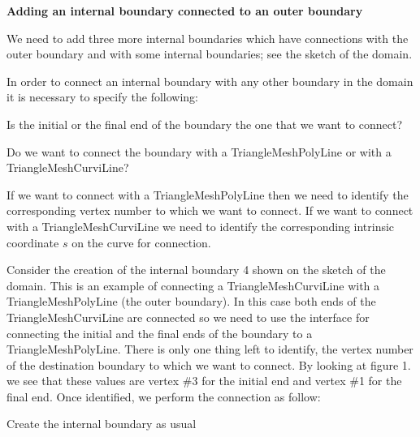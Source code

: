 {\bfseries  Adding an internal boundary connected to an outer boundary }

We need to add three more internal boundaries which have connections with the outer boundary and with some internal boundaries; see the sketch of the domain.

In order to connect an internal boundary with any other boundary in the domain it is necessary to specify the following\+:


\begin{DoxyItemize}
\item Is the initial or the final end of the boundary the one that we want to connect?
\item Do we want to connect the boundary with a {\ttfamily Triangle\+Mesh\+Poly\+Line} or with a {\ttfamily Triangle\+Mesh\+Curvi\+Line}?
\item If we want to connect with a {\ttfamily Triangle\+Mesh\+Poly\+Line} then we need to identify the corresponding vertex number to which we want to connect. If we want to connect with a {\ttfamily Triangle\+Mesh\+Curvi\+Line} we need to identify the corresponding intrinsic coordinate $ s $ on the curve for connection.
\end{DoxyItemize}





Consider the creation of the internal boundary 4 shown on the sketch of the domain. This is an example of connecting a {\ttfamily Triangle\+Mesh\+Curvi\+Line} with a {\ttfamily Triangle\+Mesh\+Poly\+Line} (the outer boundary). In this case both ends of the {\ttfamily Triangle\+Mesh\+Curvi\+Line} are connected so we need to use the interface for connecting the initial and the final ends of the boundary to a {\ttfamily Triangle\+Mesh\+Poly\+Line}. There is only one thing left to identify, the vertex number of the destination boundary to which we want to connect. By looking at figure 1. we see that these values are vertex \#3 for the initial end and vertex \#1 for the final end. Once identified, we perform the connection as follow\+:


\begin{DoxyItemize}
\item Create the internal boundary as usual
\end{DoxyItemize}

